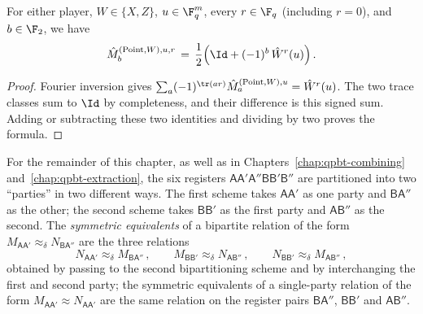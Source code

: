 \begin{lemma}
	\label{lem:expanded-point-trace-half-add}
	\leanok
	For either player, $W \in \{X,Z\}$, $u \in \F_q^m$, every $r \in \F_q$
	(including $r=0$), and $b \in \F_2$, we have
	\begin{equation}\label{eq:lc-22}
		\hat{M}^{(\mathrm{Point},W),u,r}_b \,=\, \frac{1}{2} \Big( \Id + (-1)^b\, \hat{W}^r(u) \Big)\,.
	\end{equation}
\end{lemma}
\begin{proof}
	\leanok
	Fourier inversion gives
	$\sum_a(-1)^{\tr(ar)}\hat{M}^{(\mathrm{Point},W),u}_a=\hat{W}^r(u)$.
	The two trace classes sum to $\Id$ by completeness, and their difference
	is this signed sum. Adding or subtracting these two identities and
	dividing by two proves the formula.
\end{proof}

\begin{definition}
	\label{def:symmetric-equivalents}
	\leanok
	For the remainder of this chapter, as well as in
	Chapters~\ref{chap:qpbt-combining} and~\ref{chap:qpbt-extraction}, the
	six registers
	$\mathsf{A}\mathsf{A}'\mathsf{A}''\mathsf{B}\mathsf{B}'\mathsf{B}''$
	are partitioned into two ``parties'' in two different ways. The first
	scheme takes $\mathsf{A}\mathsf{A}'$ as one party and
	$\mathsf{B}\mathsf{A}''$ as the other; the second scheme takes
	$\mathsf{B}\mathsf{B}'$ as the first party and
	$\mathsf{A}\mathsf{B}''$ as the second. The \emph{symmetric
	equivalents} of a bipartite relation of the form
	$M_{\mathsf{A}\mathsf{A}'} \approx_\delta N_{\mathsf{B}\mathsf{A}''}$
	are the three relations
	\[
		N_{\mathsf{A}\mathsf{A}'} \approx_\delta M_{\mathsf{B}\mathsf{A}''}\,,\qquad
		M_{\mathsf{B}\mathsf{B}'} \approx_\delta N_{\mathsf{A}\mathsf{B}''}\,,\qquad
		N_{\mathsf{B}\mathsf{B}'} \approx_\delta M_{\mathsf{A}\mathsf{B}''}\,,
	\]
	obtained by passing to the second bipartitioning scheme and by
	interchanging the first and second party; the symmetric equivalents of
	a single-party relation of the form
	$M_{\mathsf{A}\mathsf{A}'} \approx N_{\mathsf{A}\mathsf{A}'}$ are the
	same relation on the register pairs $\mathsf{B}\mathsf{A}''$,
	$\mathsf{B}\mathsf{B}'$ and $\mathsf{A}\mathsf{B}''$.
\end{definition}

